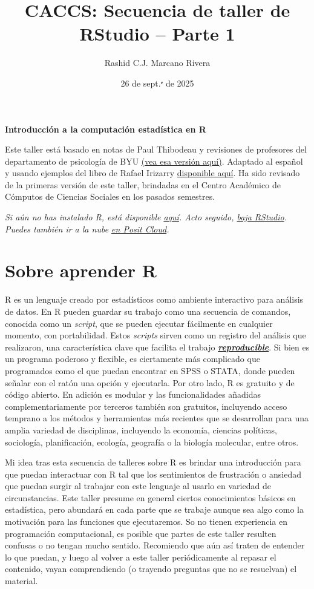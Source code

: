 \documentclass[
]{article}
\title{CACCS: Secuencia de taller de RStudio -- Parte 1}
\author{Rashid C.J. Marcano Rivera}
\date{26 de sept.ᵉ de 2025}
\begin{document}
\maketitle

{
\setcounter{tocdepth}{2}
\tableofcontents
}
\textbf{Introducción a la computación estadística en R}

Este taller está basado en notas de Paul Thibodeau y revisiones de
profesores del departamento de psicología de BYU
\href{https://fhssrsc.byu.edu/r-workshop}{(vea esa versión aquí)}.
Adaptado al español y usando ejemplos del libro de Rafael Irizarry
\href{https://leanpub.com/dslibro}{disponible aquí}. Ha sido revisado de
la primeras versión de este taller, brindadas en el Centro Académico de
Cómputos de Ciencias Sociales en los pasados semestres.

\emph{Si aún no has instalado R, está disponible
\href{http://cran.us.r-project.org/}{aquí}. Acto seguido,
\href{https://posit.co/download/rstudio-desktop/}{baja RStudio}. Puedes
también ir a la nube \href{https://posit.cloud/}{en Posit Cloud}.}

\section{Sobre aprender R}\label{sobre-aprender-r}

R es un lenguaje creado por estadísticos como ambiente interactivo para
análisis de datos. En R pueden guardar su trabajo como una secuencia de
comandos, conocida como un \emph{script}, que se pueden ejecutar
fácilmente en cualquier momento, con portabilidad. Estos \emph{scripts}
sirven como un registro del análisis que realizaron, una característica
clave que facilita el trabajo \ul{\textbf{\emph{reproducible}}}. Si bien
es un programa poderoso y flexible, es ciertamente más complicado que
programados como el que puedan encontrar en SPSS o STATA, donde pueden
señalar con el ratón una opción y ejecutarla. Por otro lado, R es
gratuito y de código abierto. En adición es modular y las
funcionalidades añadidas complementariamente por terceros también son
gratuitos, incluyendo acceso temprano a los métodos y herramientas más
recientes que se desarrollan para una amplia variedad de disciplinas,
incluyendo la economía, ciencias políticas, sociología, planificación,
ecología, geografía o la biología molecular, entre otros.

Mi idea tras esta secuencia de talleres sobre R es brindar una
introducción para que puedan interactuar con R tal que los sentimientos
de frustración o ansiedad que puedan surgir al trabajar con este
lenguaje al usarlo en variedad de circunstancias. Este taller presume en
general ciertos conocimientos básicos en estadística, pero abundará en
cada parte que se trabaje aunque sea algo como la motivación para las
funciones que ejecutaremos. So no tienen experiencia en programación
computacional, es posible que partes de este taller resulten confusas o
no tengan mucho sentido. Recomiendo que aún así traten de entender lo
que puedan, y luego al volver a este taller periódicamente al repasar el
contenido, vayan comprendiendo (o trayendo preguntas que no se
resuelvan) el material.
\end{document}
